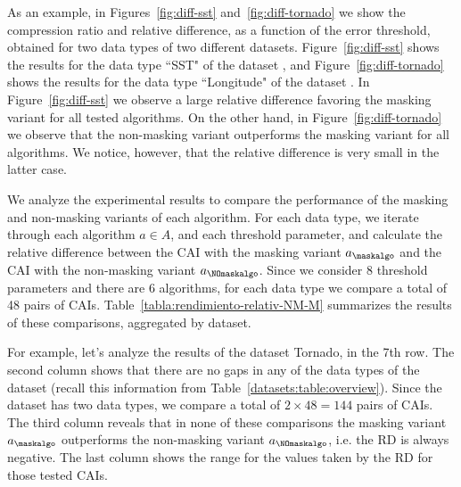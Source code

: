 \vspace{+2pt}
As an example, in Figures~\ref{fig:diff-sst} and~\ref{fig:diff-tornado} we show the compression ratio and relative difference, as a function of the error threshold, obtained for two data types of two different datasets. Figure~\ref{fig:diff-sst} shows the results for the data type ``SST" of the dataset \datasetsst, and Figure~\ref{fig:diff-tornado} shows the results for the data type ``Longitude" of the dataset \datasettornado. In Figure~\ref{fig:diff-sst} we observe a large relative difference favoring the masking variant for all tested algorithms. On the other hand, in Figure~\ref{fig:diff-tornado} we observe that the non-masking variant outperforms the masking variant for all algorithms. We notice, however, that the relative difference is very small in the latter case.


\clearpage



\clearpage


We analyze the experimental results to compare the performance of the masking and non-masking variants of each algorithm. For each data type, we iterate through each algorithm $a \in A$, and each threshold parameter, and calculate the relative difference between the CAI with the masking variant $a_\maskalgo$ and the CAI with the non-masking variant $a_\NOmaskalgo$. Since we consider 8 threshold parameters and there are 6 algorithms, for each data type we compare a total of 48 pairs of CAIs. Table~\ref{tabla:rendimiento-relativ-NM-M} summarizes the results of these comparisons, aggregated by dataset.


\vspace{+5pt}

\vspace{-5pt}


For example, let's analyze the results of the dataset Tornado, in the 7th row. The second column shows that there are no gaps in any of the data types of the dataset (recall this information from Table~\ref{datasets:table:overview}). Since the dataset has two data types, we compare a total of $2\times48=144$ pairs of CAIs. The third column reveals that in none of these comparisons the masking variant $a_\maskalgo$ outperforms the non-masking variant $a_\NOmaskalgo$, i.e. the RD is always negative. The last column shows the range for the values taken by the RD for those tested CAIs.



